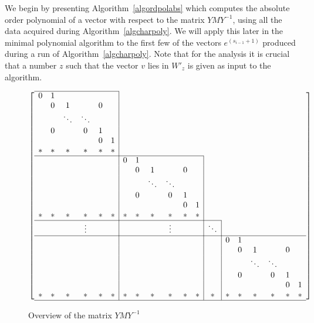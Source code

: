 We begin by presenting Algorithm~\ref{algordpolabs} which computes the
absolute order polynomial of a vector with respect to the matrix $YMY^{-1}$,
using all the data acquired during Algorithm~\ref{algcharpoly}. 
We will apply this later
in the minimal polynomial algorithm to the first few of the vectors 
$e^{(s_{i-1}+1)}$ 
produced during a run of Algorithm~\ref{algcharpoly}. Note that for 
the analysis it is crucial that a number $z$ such that
the vector $v$ lies in $W'_z$ 
is given as input to the algorithm.

\begin{figure}
\caption{Overview of the matrix $YMY^{-1}$}
\label{bigmat}
\[ \left[ \begin{array}{cccccc|cccccc|c|cccccc}
\cline{1-6}
  0 & 1 &      &      &   &   \\
    & 0 & 1    &      & 0 &   \\
    &   &\ddots&\ddots&   &   \\
    & 0 &      &   0  & 1 &   \\
    &   &      &      & 0 & 1 \\
  {}* & * &   *  &   *  & * & * \\
\cline{1-12}
  &&&&&& 0 & 1 &      &      &   &   \\
  &&&&&&  & 0 & 1    &      & 0 &   \\
  &&&&&&  &   &\ddots&\ddots&   &   \\
  &&&&&&  & 0 &      &   0  & 1 &   \\
  &&&&&&  &   &      &      & 0 & 1 \\
  {}*&*&*&*&*&*&* & * &   *  &   *  & * & * \\
\cline{1-13}
  &&&\vdots&&& &&&\vdots&&& \ddots \\
\cline{1-19}
  &&&&&& &&&&&& & 0 & 1 &      &      &   &   \\
  &&&&&& &&&&&& & & 0 & 1    &      & 0 &   \\
  &&&&&& &&&&&& & &   &\ddots&\ddots&   &   \\
  &&&&&& &&&&&& & & 0 &      &   0  & 1 &   \\
  &&&&&& &&&&&& & &   &      &      & 0 & 1 \\
  {}*&*&*&*&*&*& *&*&*&*&*&*&* &*& * &   *  &   *  & * & * \\
\hline
\end{array} \right] \]
\end{figure}

